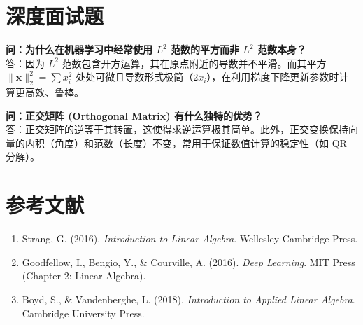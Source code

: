\documentclass[12pt, a4paper]{article}
\begin{document}
\section{深度面试题}

\textbf{问：为什么在机器学习中经常使用 $L^2$ 范数的平方而非 $L^2$ 范数本身？}\\
答：因为 $L^2$ 范数包含开方运算，其在原点附近的导数并不平滑。而其平方 $\|\mathbf{x}\|_2^2 = \sum x_i^2$ 处处可微且导数形式极简（$2x_i$），在利用梯度下降更新参数时计算更高效、鲁棒。

\textbf{问：正交矩阵 (Orthogonal Matrix) 有什么独特的优势？}\\
答：正交矩阵的逆等于其转置，这使得求逆运算极其简单。此外，正交变换保持向量的内积（角度）和范数（长度）不变，常用于保证数值计算的稳定性（如 QR 分解）。

\section{参考文献}
\begin{enumerate}
    \item Strang, G. (2016). \textit{Introduction to Linear Algebra}. Wellesley-Cambridge Press.
    \item Goodfellow, I., Bengio, Y., \& Courville, A. (2016). \textit{Deep Learning}. MIT Press (Chapter 2: Linear Algebra).
    \item Boyd, S., \& Vandenberghe, L. (2018). \textit{Introduction to Applied Linear Algebra}. Cambridge University Press.
\end{enumerate}
\end{document}
